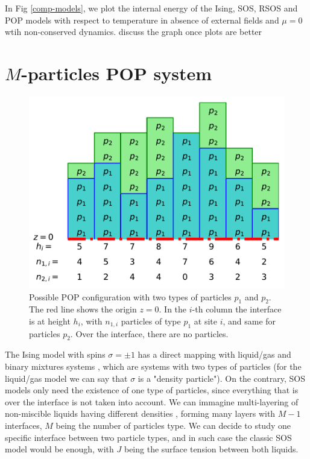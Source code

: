 In Fig \ref{comp-models}, we plot the internal energy of the Ising, SOS, RSOS and POP models with respect to temperature in absence of external fields and $\mu=0$ wtih non-conserved dynamics. {\color{red} discuss the graph once plots are better}

    \section{$M$-particles POP system}

\begin{figure}
    \centering
    \includegraphics[width=0.7\linewidth]{pop/figure-pop.pdf}
    \caption{Possible POP configuration with two types of particles $p_1$ and $p_2$. The red line shows the origin $z=0$. In the $i$-th column the interface is at height $h_i$, with $n_{1,i}$ particles of type $p_1$ at site $i$, and same for particles $p_2$. Over the interface, there are no particles. }
    \label{fig-pop}
\end{figure}

The Ising model with spins $\sigma= \pm1$ has a direct mapping with liquid/gas and binary mixtures systems \cite{goldenfeld_lectures_2018}, which are systems with two types of particles (for the liquid/gas model we can say that $\sigma$ is a "density particle"). On the contrary, SOS models only need the existence of one type of particles, since everything that is over the interface is not taken into account. We can immagine multi-layering of non-miscible liquids having different densities \cite{wang_instability_1978,bonizzi_simulation_2003}, forming many layers with $M-1$ interfaces, $M$ being the number of particles type. We can decide to study one specific interface between two particle types, and in such case the classic SOS model would be enough, with $J$ being the surface tension between both liquids. 

